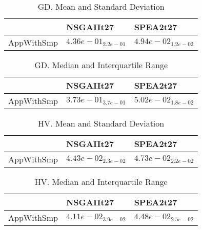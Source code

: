 \documentclass{article}
\begin{document}
\begin{table}
\caption{GD. Mean and Standard Deviation}
\label{table: GD}
\centering
\begin{scriptsize}
\begin{tabular}{lll}
\hline & NSGAIIt27 &  SPEA2t27\\
\hline 
AppWithSmp & \cellcolor{gray25}$  4.36e-01_{ 2.2e-01}$ & \cellcolor{gray95}$  4.94e-02_{ 1.2e-02}$ \\
\hline
\end{tabular}
\end{scriptsize}
\end{table}

\begin{table}
\caption{GD. Median and Interquartile Range}
\label{table: GD}
\centering
\begin{scriptsize}
\begin{tabular}{lll}
\hline & NSGAIIt27 &  SPEA2t27\\
\hline 
AppWithSmp & \cellcolor{gray25}$  3.73e-01_{ 3.7e-01}$ & \cellcolor{gray95}$  5.02e-02_{ 1.8e-02}$ \\
\hline
\end{tabular}
\end{scriptsize}
\end{table}

\begin{table}
\caption{HV. Mean and Standard Deviation}
\label{table: HV}
\centering
\begin{scriptsize}
\begin{tabular}{lll}
\hline & NSGAIIt27 &  SPEA2t27\\
\hline 
AppWithSmp & \cellcolor{gray25}$  4.43e-02_{ 2.3e-02}$ & \cellcolor{gray95}$  4.73e-02_{ 2.2e-02}$ \\
\hline
\end{tabular}
\end{scriptsize}
\end{table}

\begin{table}
\caption{HV. Median and Interquartile Range}
\label{table: HV}
\centering
\begin{scriptsize}
\begin{tabular}{lll}
\hline & NSGAIIt27 &  SPEA2t27\\
\hline 
AppWithSmp & \cellcolor{gray25}$  4.11e-02_{ 3.9e-02}$ & \cellcolor{gray95}$  4.48e-02_{ 2.5e-02}$ \\
\hline
\end{tabular}
\end{scriptsize}
\end{table}
\end{document}
